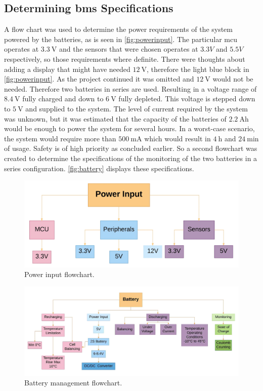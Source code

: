 \subsection{Determining \gls{bms} Specifications}
A flow chart was used to determine the power requirements of the system powered by the batteries, as is seen in \autoref{fig:powerinput}. The particular \gls{mcu} operates at $3.3~\textrm{V}$ and the sensors that were chosen operates at $3.3V$ and $5.5V$ respectively, so those requirements where definite. There were thoughts about adding a display that might have needed $12~\textrm{V}$, therefore the light blue block in \autoref{fig:powerinput}. As the project continued it was omitted and $12~\textrm{V}$ would not be needed. Therefore two batteries in series are used. Resulting in a voltage range of $8.4~\textrm{V}$ fully charged and down to $6~\textrm{V}$ fully depleted. This voltage is stepped down to $5~\textrm{V}$ and supplied to the system.
The level of current required by the system was unknown, but it was estimated that the capacity of the batteries of $2.2~\textrm{Ah}$ would be enough to power the system for several hours.
In a worst-case scenario, the system would require  more than $500~\textrm{mA}$ which would result in $4~\textrm{h}$ and $24~\textrm{min}$ of usage.
Safety is of high priority as concluded earlier. So a second flowchart was created to determine the specifications of the monitoring of the two batteries in a series configuration. \autoref{fig:battery} displays these specifications.

\begin{figure}[H]
	\centering
	\includegraphics[width=\textwidth]{Figures/powerinput.png}
	\caption{Power input flowchart.}
	\label{fig:powerinput}
\end{figure}

\begin{figure}[H]
	\centering
	\includegraphics[width=\textwidth]{Figures/battery.jpg}
	\caption{Battery management flowchart.}
	\label{fig:battery}
\end{figure}

